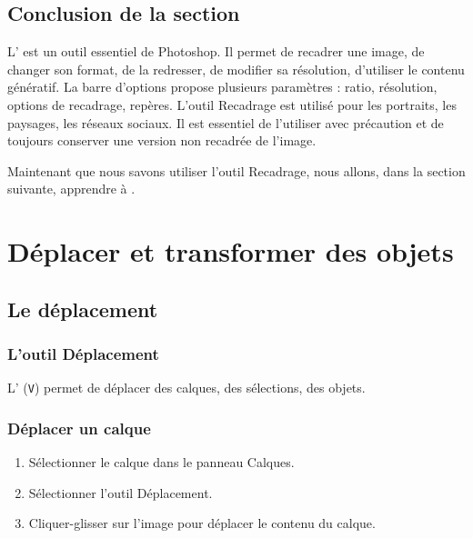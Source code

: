\subsection*{Conclusion de la section}

L' est un outil essentiel de Photoshop. Il permet de recadrer une image, de changer son format, de la redresser, de modifier sa résolution, d'utiliser le contenu génératif. La barre d'options propose plusieurs paramètres : ratio, résolution, options de recadrage, repères. L'outil Recadrage est utilisé pour les portraits, les paysages, les réseaux sociaux. Il est essentiel de l'utiliser avec précaution et de toujours conserver une version non recadrée de l'image.

Maintenant que nous savons utiliser l'outil Recadrage, nous allons, dans la section suivante, apprendre à .

\section{Déplacer et transformer des objets}

\subsection{Le déplacement}

\subsubsection{L'outil Déplacement}

L' (\texttt{V}) permet de déplacer des calques, des sélections, des objets.

\subsubsection{Déplacer un calque}

\begin{enumerate}
    \item Sélectionner le calque dans le panneau Calques.
    \item Sélectionner l'outil Déplacement.
    \item Cliquer-glisser sur l'image pour déplacer le contenu du calque.
\end{enumerate}

